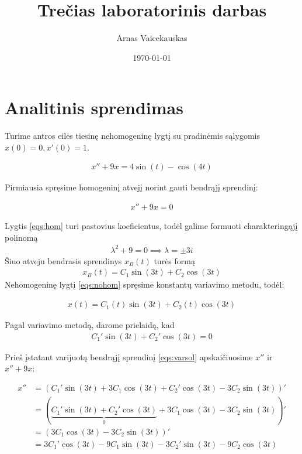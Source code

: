 \documentclass[11pt]{article}
\title{ Trečias laboratorinis darbas}
\author{ Arnas Vaicekauskas }
\date{\today}
\begin{document}
\maketitle

\section{Analitinis sprendimas}

Turime antros eilės tiesinę nehomogeninę lygtį su pradinėmis sąlygomis $x(0)=0,x'(0)=1$.

\begin{align}
x''+9x=4\sin(t)-\cos(4t) \label{eqs:nohom}
\end{align}

Pirmiausia spręsime homogeninį atvejį norint gauti bendrąjį sprendinį:

\begin{align}
    x''+9x=0 \label{eqs:hom}
\end{align}

Lygtis \eqref{eqs:hom} turi pastovius koeficientus, 
todėl galime formuoti charakteringąjį polinomą
\begin{align*}
    \lambda^2+9=0\implies\lambda=\pm3i
\end{align*}
Šiuo atveju bendrasis sprendinys $x_B(t)$ turės formą 
\begin{align}
x_B(t)=C_1\sin(3t)+C_2\cos(3t)
\end{align}
Nehomogeninę lygtį \eqref{eqs:nohom} spręsime
konstantų variavimo metodu, todėl:

\begin{align}
x(t)=C_1(t)\sin(3t)+C_2(t)\cos(3t) \label{eqs:varsol}
\end{align}

Pagal variavimo metodą, darome prielaidą, kad 
\begin{align}
C_1'\sin(3t)+C_2'\cos(3t)=0  \label{eqs:assumtion}
\end{align}

Prieš įstatant varijuotą bendrąjį sprendinį \eqref{eqs:varsol} apskaičiuosime $x''$ ir \\ $x''+9x$: 

\begin{align*}
x''&=(C_1'\sin(3t)+3C_1\cos(3t)+C_2'\cos(3t)-3C_2\sin(3t))'\\
&=(\underbrace{C_1'\sin(3t)+C_2'\cos(3t)}_0+3C_1\cos(3t)-3C_2\sin(3t))'\\
&=(3C_1\cos(3t)-3C_2\sin(3t))'\\
&=3C_1'\cos(3t)-9C_1\sin(3t)-3C_2'\sin(3t)-9C_2\cos(3t)
\end{align*}
\end{document}
